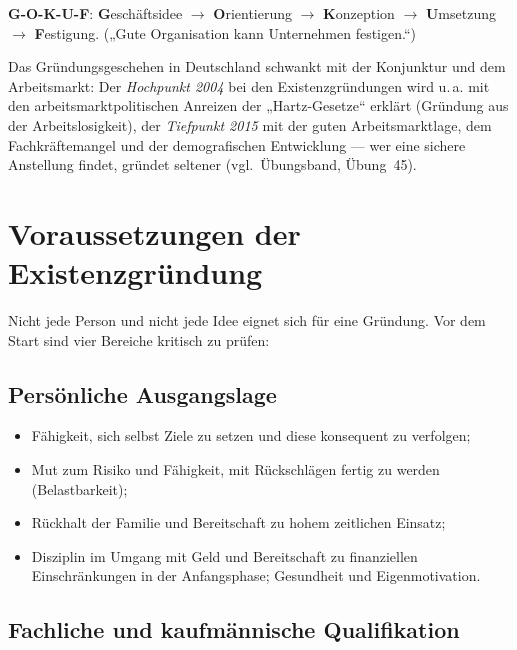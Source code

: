 \documentclass[11pt, a4paper]{article}
\begin{document}
\begin{eselsbruecke}
\textbf{G-O-K-U-F}: \textbf{G}eschäftsidee $\rightarrow$ \textbf{O}rientierung
$\rightarrow$ \textbf{K}onzeption $\rightarrow$ \textbf{U}msetzung $\rightarrow$
\textbf{F}estigung. („Gute Organisation kann Unternehmen festigen.``)
\end{eselsbruecke}

\begin{beispiel}
Das Gründungsgeschehen in Deutschland schwankt mit der Konjunktur und dem Arbeitsmarkt:
Der \emph{Hochpunkt 2004} bei den Existenzgründungen wird u.\,a. mit den
arbeitsmarktpolitischen Anreizen der „Hartz-Gesetze`` erklärt (Gründung aus der
Arbeitslosigkeit), der \emph{Tiefpunkt 2015} mit der guten Arbeitsmarktlage, dem
Fachkräftemangel und der demografischen Entwicklung --- wer eine sichere Anstellung
findet, gründet seltener (vgl.\ Übungsband, Übung~45).
\end{beispiel}

\section{Voraussetzungen der Existenzgründung}

Nicht jede Person und nicht jede Idee eignet sich für eine Gründung. Vor dem Start sind
vier Bereiche kritisch zu prüfen:

\subsection{Persönliche Ausgangslage}

\begin{itemize}
  \item Fähigkeit, sich selbst Ziele zu setzen und diese konsequent zu verfolgen;
  \item Mut zum Risiko und Fähigkeit, mit Rückschlägen fertig zu werden (Belastbarkeit);
  \item Rückhalt der Familie und Bereitschaft zu hohem zeitlichen Einsatz;
  \item Disziplin im Umgang mit Geld und Bereitschaft zu finanziellen Einschränkungen
    in der Anfangsphase; Gesundheit und Eigenmotivation.
\end{itemize}

\subsection{Fachliche und kaufmännische Qualifikation}
\end{document}
